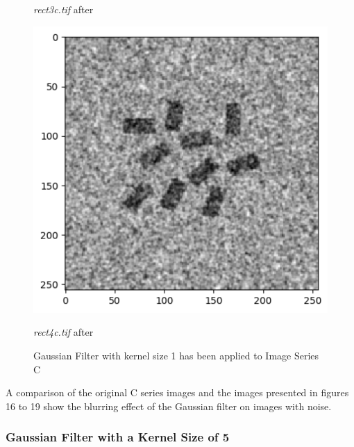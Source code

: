 \documentclass[runningheads]{llncs}
\begin{document}
\begin{figure}[h!]
\begin{minipage}[h]{0.47\linewidth}
\begin{center}
\caption{\emph{rect3c.tif} after}
\label{hc3-Gaussian and Kernel 1}
\end{center}
\end{minipage}
\hfill
\begin{minipage}[h]{0.47\linewidth}
\begin{center}
\includegraphics[width=1\linewidth]{Report/Result_Images/image_hc4.png} 
\caption{\emph{rect4c.tif} after}
\label{hc4-Gaussian and Kernel 1}
\end{center}
\end{minipage}
\caption*{Gaussian Filter with kernel size 1 has been applied to Image Series C}
\label{hc1-4 Gaussian1}
\end{figure}

A comparison of the original C series images and the images presented in figures 16 to 19 show the blurring effect of the Gaussian filter on images with noise. 

\newpage
\subsubsection*{Gaussian Filter with a Kernel Size of 5}
\end{document}

